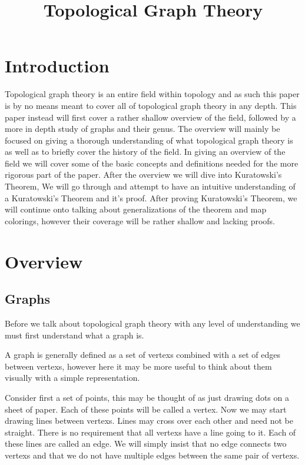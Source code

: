 \documentclass{article}
\title{Topological Graph Theory}
\begin{document}
\maketitle
\tableofcontents



\section{Introduction}
Topological graph theory is an entire field within topology and as such this paper is by no means meant to cover all of topological graph theory in any depth. This paper instead will first cover a rather shallow overview of the field, followed by a more in depth study of graphs and their genus. The overview will mainly be focused on giving a thorough understanding of what topological graph theory is as well as to briefly cover the history of the field. In giving an overview of the field we will cover some of the basic concepts and definitions needed for the more rigorous part of the paper. After the overview we will dive into Kuratowski's Theorem, We will go through and attempt to have an intuitive understanding of a Kuratowski's Theorem and it's proof. After proving Kuratowski's Theorem, we will continue onto talking about generalizations of the theorem and map colorings, however their coverage will be rather shallow and lacking proofs.

\section{Overview}
\subsection{Graphs}
Before we talk about topological graph theory with any level of understanding we must first understand what a \gls{graph} is.

A \gls{graph} is generally defined as a \gls{set} of \glspl{vertex} combined with a \gls{set} of \glspl{edge} between \glspl{vertex}, however here it may be more useful to think about them visually with a simple representation.

Consider first a \gls{set} of points, this may be thought of as just drawing dots on a sheet of paper. Each of these points will be called a \gls{vertex}. Now we may start drawing lines between \glspl{vertex}. Lines may cross over each other and need not be straight. There is no requirement that all \glspl{vertex} have a line going to it. Each of these lines are called an \gls{edge}. We will simply insist that no \gls{edge} connects two \glspl{vertex} and that we do not have multiple \glspl{edge} between the same pair of \glspl{vertex}.
\end{document}
